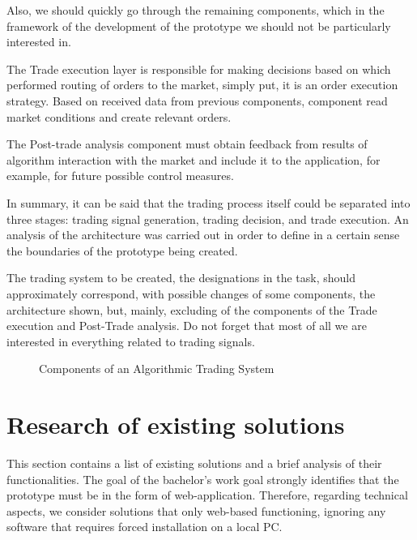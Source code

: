 \documentclass[thesis=B,english]{FITthesis}[2019/03/06]
\begin{document}
Also, we should quickly go through the remaining components, which in the framework of the development of the prototype we should not be particularly interested in. 

The Trade execution layer is responsible for making decisions based on which performed routing of orders to the market, simply put, it is an order execution strategy. Based on received data from previous components, component read market conditions and create relevant orders.

The Post-trade analysis component must obtain feedback from results of algorithm interaction with the market and include it to the application, for example, for future possible control measures.

In summary, it can be said that the trading process itself could be separated into three stages: trading signal generation, trading decision, and trade execution. An analysis of the architecture was carried out in order to define in a certain sense the boundaries of the prototype being created. 

The trading system to be created, the designations in the task, should approximately correspond, with possible changes of some components, the architecture shown, but, mainly, excluding of the components of the Trade execution and Post-Trade analysis. Do not forget that most of all we are interested in everything related to trading signals.

\begin{figure}[!ht]
\centering
\caption{Components of an Algorithmic Trading System}
\label{fig:CATS}
\end{figure}

\section{Research of existing solutions}
This section contains a list of existing solutions and a brief analysis of their functionalities. The goal of the bachelor's work goal strongly identifies that the prototype must be in the form of web-application. Therefore, regarding technical aspects, we consider solutions that only web-based functioning, ignoring any software that requires forced installation on a local PC.
\end{document}
